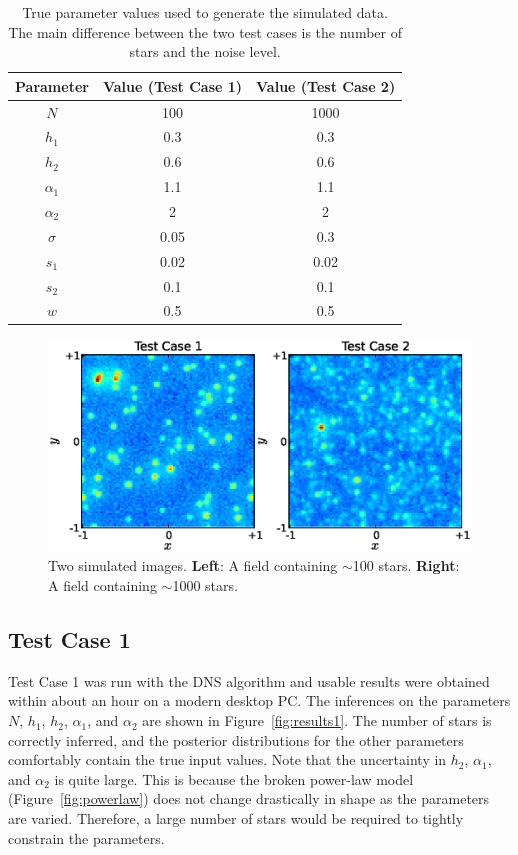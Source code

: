 \documentclass[manuscript]{aastex}
\begin{document}
\begin{table}\footnotesize
\begin{center}
\begin{tabular}{|c|c|c|}
\hline
Parameter & Value (Test Case 1) & Value (Test Case 2)\\
\hline
$N$ & 100 & 1000\\
$h_1$ & 0.3 & 0.3\\
$h_2$ & 0.6 & 0.6\\
$\alpha_1$ & 1.1 & 1.1\\
$\alpha_2$ & 2 & 2\\
\hline
$\sigma$ & 0.05 & 0.3\\
$s_1$ & 0.02 & 0.02\\
$s_2$ & 0.1 & 0.1\\
$w$ & 0.5 & 0.5\\
\hline
\end{tabular}
\end{center}
\caption{True parameter values used to generate the simulated data. The main
difference between the two test cases is the number of stars and the noise level.
\label{tab:truth}}
\end{table}

\begin{figure}
\begin{center}
\includegraphics[scale=0.7]{Figures/test_cases.eps}
\caption{Two simulated images.
{\bf Left}: A field containing $\sim$100 stars.
{\bf Right}: A field containing $\sim$1000 stars.\label{fig:simulated_data}}
\end{center}
\end{figure}

\subsection{Test Case 1}
Test Case 1 was run with the DNS algorithm and usable results were obtained
within about an hour on a modern desktop PC. The inferences on the parameters
$N$, $h_1$, $h_2$, $\alpha_1$, and $\alpha_2$ are shown in
Figure~\ref{fig:results1}. The number of stars is correctly inferred, and the
posterior distributions for the other parameters comfortably contain the true
input values. Note that the uncertainty in $h_2$, $\alpha_1$, and $\alpha_2$ is
quite large. This is because the broken power-law model
(Figure~\ref{fig:powerlaw}) does not change drastically in shape as the
parameters are varied. Therefore, a large number of stars would be required to
tightly constrain the parameters.
\end{document}
